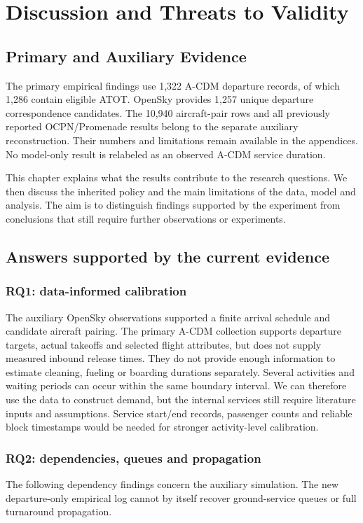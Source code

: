 \chapter{Discussion and Threats to Validity}
\label{ch:discussion}
\section{Primary and Auxiliary Evidence}
The primary empirical findings use 1,322 A-CDM departure records, of which 1,286 contain eligible ATOT. OpenSky provides 1,257 unique departure correspondence candidates. The 10,940 aircraft-pair rows and all previously reported OCPN/Promenade results belong to the separate auxiliary reconstruction. Their numbers and limitations remain available in the appendices. No model-only result is relabeled as an observed A-CDM service duration.


This chapter explains what the results contribute to the research questions. We then discuss the inherited policy and the main limitations of the data, model and analysis. The aim is to distinguish findings supported by the experiment from conclusions that still require further observations or experiments.

\section{Answers supported by the current evidence}
\subsection{RQ1: data-informed calibration}
The auxiliary OpenSky observations supported a finite arrival schedule and candidate aircraft pairing. The primary A-CDM collection supports departure targets, actual takeoffs and selected flight attributes, but does not supply measured inbound release times. They do not provide enough information to estimate cleaning, fueling or boarding durations separately. Several activities and waiting periods can occur within the same boundary interval. We can therefore use the data to construct demand, but the internal services still require literature inputs and assumptions. Service start/end records, passenger counts and reliable block timestamps would be needed for stronger activity-level calibration.

\subsection{RQ2: dependencies, queues and propagation}
The following dependency findings concern the auxiliary simulation. The new departure-only empirical log cannot by itself recover ground-service queues or full turnaround propagation.

